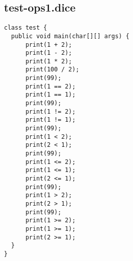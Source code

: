 \subsection{test-ops1.dice}
\begin{verbatim}
class test {
  public void main(char[][] args) {
      print(1 + 2);
      print(1 - 2);
      print(1 * 2);
      print(100 / 2);
      print(99);
      print(1 == 2);
      print(1 == 1);
      print(99);
      print(1 != 2);
      print(1 != 1);
      print(99);
      print(1 < 2);
      print(2 < 1);
      print(99);
      print(1 <= 2);
      print(1 <= 1);
      print(2 <= 1);
      print(99);
      print(1 > 2);
      print(2 > 1);
      print(99);
      print(1 >= 2);
      print(1 >= 1);
      print(2 >= 1);
  }
}

\end{verbatim}